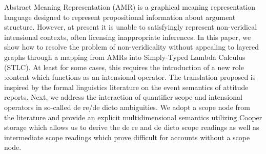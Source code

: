 Abstract Meaning Representation (AMR) is a graphical meaning representation language designed to represent propositional information about argument structure. However, at present it is unable to satisfyingly represent non-veridical intensional contexts, often licensing inappropriate inferences. In this paper, we show how to resolve the problem of non-veridicality without appealing to layered graphs through a mapping from AMRs into Simply-Typed Lambda Calculus (STLC). At least for some cases, this requires the introduction of a new role :content which functions as an intensional operator. The translation proposed is inspired by the formal linguistics literature on the event semantics of attitude reports. Next, we address the interaction of quantifier scope and intensional operators in so-called de re/de dicto ambiguities. We adopt a scope node from the literature and provide an explicit multidimensional semantics utilizing Cooper storage which allows us to derive the de re and de dicto scope readings as well as intermediate scope readings which prove difficult for accounts without a scope node.
